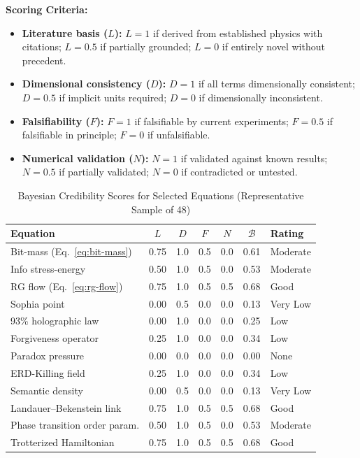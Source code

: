 \documentclass[11pt,a4paper]{article}
\begin{document}
\textbf{Scoring Criteria:}

\begin{itemize}[leftmargin=1.5em]
  \item \textbf{Literature basis ($L$):} $L = 1$ if derived from established physics with citations; $L = 0.5$ if partially grounded; $L = 0$ if entirely novel without precedent.
  \item \textbf{Dimensional consistency ($D$):} $D = 1$ if all terms dimensionally consistent; $D = 0.5$ if implicit units required; $D = 0$ if dimensionally inconsistent.
  \item \textbf{Falsifiability ($F$):} $F = 1$ if falsifiable by current experiments; $F = 0.5$ if falsifiable in principle; $F = 0$ if unfalsifiable.
  \item \textbf{Numerical validation ($N$):} $N = 1$ if validated against known results; $N = 0.5$ if partially validated; $N = 0$ if contradicted or untested.
\end{itemize}

\begin{table}[H]
\centering
\caption{Bayesian Credibility Scores for Selected Equations (Representative Sample of 48)}
\begin{tabular}{p{3.8cm}cccccl}
\toprule
\textbf{Equation} & $L$ & $D$ & $F$ & $N$ & $\mathcal{B}$ & \textbf{Rating} \\
\midrule
Bit-mass (Eq.~\ref{eq:bit-mass}) & 0.75 & 1.0 & 0.5 & 0.0 & 0.61 & Moderate \\
Info stress-energy & 0.50 & 1.0 & 0.5 & 0.0 & 0.53 & Moderate \\
RG flow (Eq.~\ref{eq:rg-flow}) & 0.75 & 1.0 & 0.5 & 0.5 & 0.68 & Good \\
Sophia point & 0.00 & 0.5 & 0.0 & 0.0 & 0.13 & Very Low \\
93\% holographic law & 0.00 & 1.0 & 0.0 & 0.0 & 0.25 & Low \\
Forgiveness operator & 0.25 & 1.0 & 0.0 & 0.0 & 0.34 & Low \\
Paradox pressure & 0.00 & 0.0 & 0.0 & 0.0 & 0.00 & None \\
ERD-Killing field & 0.25 & 1.0 & 0.0 & 0.0 & 0.34 & Low \\
Semantic density & 0.00 & 0.5 & 0.0 & 0.0 & 0.13 & Very Low \\
Landauer--Bekenstein link & 0.75 & 1.0 & 0.5 & 0.5 & 0.68 & Good \\
Phase transition order param. & 0.50 & 1.0 & 0.5 & 0.0 & 0.53 & Moderate \\
Trotterized Hamiltonian & 0.75 & 1.0 & 0.5 & 0.5 & 0.68 & Good \\
\bottomrule
\end{tabular}
\end{table}
\end{document}
